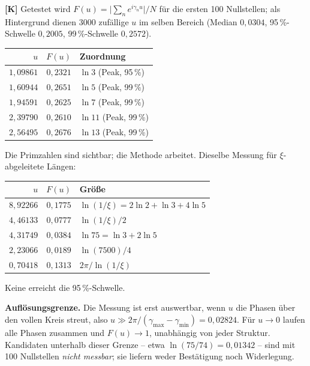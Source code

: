 \textbf{[K]} Getestet wird
$F(u) = \bigl|\sum_n e^{i\gamma_n u}\bigr|/N$ f\"ur die ersten 100
Nullstellen; als Hintergrund dienen 3000 zuf\"allige $u$ im selben
Bereich (Median $0{,}0304$, 95\,\%-Schwelle $0{,}2005$,
99\,\%-Schwelle $0{,}2572$).

\begin{center}
\begin{tabular}{rrl}
\toprule
$u$ & $F(u)$ & Zuordnung \\
\midrule
$1{,}09861$ & $0{,}2321$ & $\ln 3$ \quad(Peak, 95\,\%) \\
$1{,}60944$ & $0{,}2651$ & $\ln 5$ \quad(Peak, 99\,\%) \\
$1{,}94591$ & $0{,}2625$ & $\ln 7$ \quad(Peak, 99\,\%) \\
$2{,}39790$ & $0{,}2610$ & $\ln 11$ \quad(Peak, 99\,\%) \\
$2{,}56495$ & $0{,}2676$ & $\ln 13$ \quad(Peak, 99\,\%) \\
\bottomrule
\end{tabular}
\end{center}

Die Primzahlen sind sichtbar; die Methode arbeitet. Dieselbe Messung
f\"ur $\xi$-abgeleitete L\"angen:

\begin{center}
\begin{tabular}{rrl}
\toprule
$u$ & $F(u)$ & Gr\"o\ss e \\
\midrule
$8{,}92266$ & $0{,}1775$ & $\ln(1/\xi) = 2\ln2+\ln3+4\ln5$ \\
$4{,}46133$ & $0{,}0777$ & $\ln(1/\xi)/2$ \\
$4{,}31749$ & $0{,}0384$ & $\ln 75 = \ln3+2\ln5$ \\
$2{,}23066$ & $0{,}0189$ & $\ln(7500)/4$ \\
$0{,}70418$ & $0{,}1313$ & $2\pi/\ln(1/\xi)$ \\
\bottomrule
\end{tabular}
\end{center}

Keine erreicht die 95\,\%-Schwelle.

\textbf{Aufl\"osungsgrenze.} Die Messung ist erst auswertbar, wenn $u$
die Phasen \"uber den vollen Kreis streut, also
$u \gg 2\pi/(\gamma_{\max}-\gamma_{\min}) = 0{,}02824$. F\"ur $u\to 0$
laufen alle Phasen zusammen und $F(u)\to 1$, unabh\"angig von jeder
Struktur. Kandidaten unterhalb dieser Grenze -- etwa
$\ln(75/74) = 0{,}01342$ -- sind mit 100 Nullstellen \emph{nicht
messbar}; sie liefern weder Best\"atigung noch Widerlegung.

